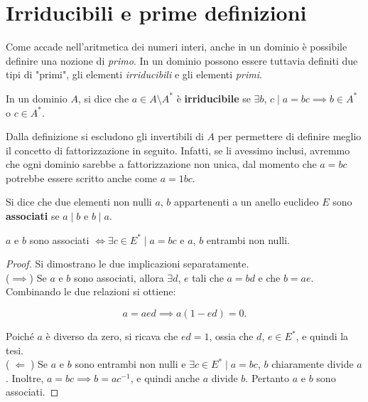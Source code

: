\section{Irriducibili e prime definizioni}

Come accade nell'aritmetica dei numeri interi, anche in un dominio è possibile definire
una nozione di \textit{primo}. In un dominio possono essere tuttavia definiti due tipi di "primi",
gli elementi \textit{irriducibili} e gli elementi \textit{primi}.

\begin{definition}
    In un dominio $A$, si dice che $a \in A \setminus A^*$ è \textbf{irriducibile} se
    $\exists b$, $c \mid a=bc \implies b \in A^*$ o $c \in A^*$.
\end{definition}

\begin{remark*}
    Dalla definizione si escludono gli invertibili di $A$ per permettere
    di definire meglio il concetto di fattorizzazione in seguito. Infatti,
    se li avessimo inclusi, avremmo che ogni dominio sarebbe a fattorizzazione
    non unica, dal momento che $a=bc$ potrebbe essere scritto anche come
    $a=1bc$.
\end{remark*}

\begin{definition}
    Si dice che due elementi non nulli $a$, $b$ appartenenti a un anello euclideo
    $E$ sono \textbf{associati} se $a \mid b$ e $b \mid a$.
\end{definition}

\begin{proposition}
    \label{prop:associati}
    $a$ e $b$ sono associati $\iff \exists c \in E^* \mid a=bc$ e $a$, $b$ entrambi non nulli.
\end{proposition}

\begin{proof} Si dimostrano le due implicazioni separatamente. \\

    ($\implies$) Se $a$ e $b$ sono associati, allora $\exists d$, $e$ tali che $a=bd$ e che $b=ae$. Combinando le due relazioni si ottiene:

    \[ a=aed \implies a(1-ed)=0.\]

    Poiché $a$ è diverso da zero, si ricava che $ed=1$, ossia
    che $d$, $e \in E^*$, e quindi la tesi. \\

    ($\;\Longleftarrow\;$) Se $a$ e $b$ sono entrambi non
    nulli e $\exists c \in E^* \mid a=bc$, $b$ chiaramente
    divide $a$. Inoltre, $a=bc \implies b=ac^{-1}$, e quindi
    anche $a$ divide $b$. Pertanto $a$ e $b$ sono associati.
\end{proof}

